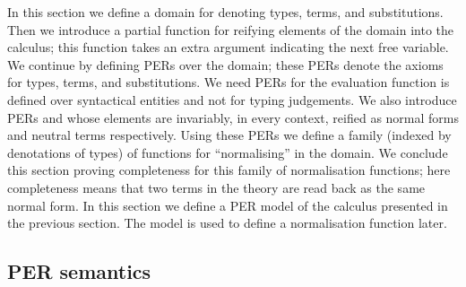 \documentclass{LMCS}
\begin{document}
\noindent In this section we define a domain  for denoting types,
  terms, and substitutions. Then we introduce a partial function
   for
  reifying elements of the domain into the calculus; this function
  takes an extra argument  indicating the next free variable.  We
  continue by defining PERs over the domain; these PERs denote the
  axioms for types, terms, and substitutions. We need PERs for the
  evaluation function is defined over syntactical entities and not for
  typing judgements. We also introduce PERs  and  
  whose elements are
  invariably, in every context, reified as normal forms and
  neutral terms respectively.  Using these PERs we define a family
  (indexed by denotations of types) of functions for ``normalising''
  in the domain. We conclude this section proving completeness for
  this family of normalisation functions; here completeness means that
  two terms in the theory are read back as the same normal form.
  In this section we define a PER model of the calculus presented in
  the previous section. The model is used to define a normalisation
  function later.

\subsection{PER semantics}
\label{sec:persem}
\end{document}
